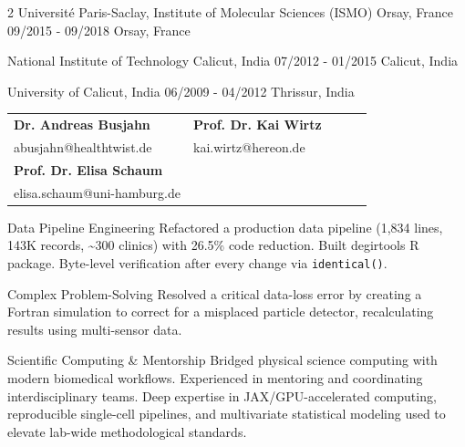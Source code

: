 \documentclass{thejus_cv}
\begin{document}
\begin{paracol}{2}
             {Universit\'e Paris-Saclay, Institute of Molecular Sciences (ISMO) Orsay, France}
             {09/2015 - 09/2018}
             {Orsay, France}
             {}

             {National Institute of Technology Calicut, India}
             {07/2012 - 01/2015}
             {Calicut, India}
             {}

             {University of Calicut, India}
             {06/2009 - 04/2012}
             {Thrissur, India}
             {}


\begin{tabular}{@{}p{0.5\linewidth} p{0.5\linewidth}@{}}
\textbf{Dr. Andreas Busjahn} & \textbf{Prof. Dr. Kai Wirtz} \\
abusjahn@healthtwist.de & kai.wirtz@hereon.de \\[0.4cm]
\textbf{Prof. Dr. Elisa Schaum} & \\
elisa.schaum@uni-hamburg.de & \\
\end{tabular}
\vspace{0.4cm}

\switchcolumn



\cvstrength{\faStar}
           {Data Pipeline Engineering}
           {Refactored a production data pipeline (1,834 lines, 143K records, \textasciitilde300 clinics) with 26.5\% code reduction. Built degirtools R package. Byte-level verification after every change via \texttt{identical()}.}

\cvstrength{\faLightbulb}
           {Complex Problem-Solving}
           {Resolved a critical data-loss error by creating a Fortran simulation to correct for a misplaced particle detector, recalculating results using multi-sensor data.}

\cvstrength{\faAward}
           {Scientific Computing \& Mentorship}
           {Bridged physical science computing with modern biomedical workflows. Experienced in mentoring and coordinating interdisciplinary teams. Deep expertise in JAX/GPU-accelerated computing, reproducible single-cell pipelines, and multivariate statistical modeling used to elevate lab-wide methodological standards.}


\end{paracol}
\end{document}
